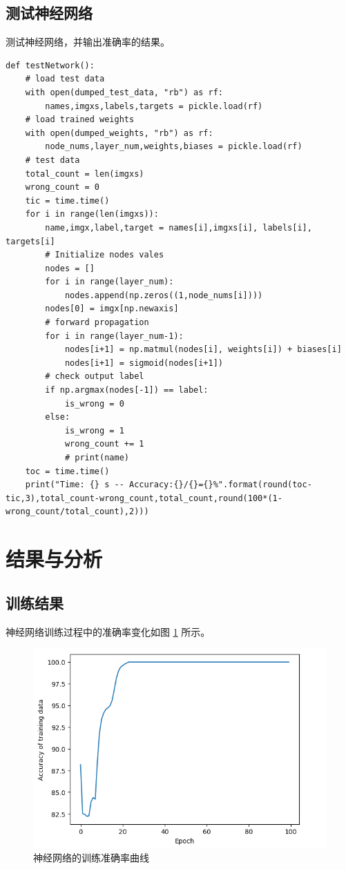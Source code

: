 \documentclass[a4paper, 12pt]{article}
\begin{document}
\subsection{测试神经网络}
测试神经网络，并输出准确率的结果。

\begin{lstlisting}[style=myPython,caption={测试神经网络}]
def testNetwork():
    # load test data
    with open(dumped_test_data, "rb") as rf:
        names,imgxs,labels,targets = pickle.load(rf)
    # load trained weights
    with open(dumped_weights, "rb") as rf:
        node_nums,layer_num,weights,biases = pickle.load(rf)
    # test data
    total_count = len(imgxs)
    wrong_count = 0
    tic = time.time()
    for i in range(len(imgxs)):
        name,imgx,label,target = names[i],imgxs[i], labels[i], targets[i]
        # Initialize nodes vales
        nodes = []
        for i in range(layer_num):
            nodes.append(np.zeros((1,node_nums[i])))
        nodes[0] = imgx[np.newaxis]
        # forward propagation
        for i in range(layer_num-1):
            nodes[i+1] = np.matmul(nodes[i], weights[i]) + biases[i]
            nodes[i+1] = sigmoid(nodes[i+1])
        # check output label
        if np.argmax(nodes[-1]) == label:
            is_wrong = 0
        else:
            is_wrong = 1
            wrong_count += 1
            # print(name)
    toc = time.time()
    print("Time: {} s -- Accuracy:{}/{}={}%".format(round(toc-tic,3),total_count-wrong_count,total_count,round(100*(1-wrong_count/total_count),2)))
\end{lstlisting}

\newpage

\section{结果与分析}
\subsection{训练结果}

神经网络训练过程中的准确率变化如图 \ref{fig:train} 所示。

\begin{figure}[htbp]
\centering
\includegraphics[width=\textwidth]{images/train.png}
\caption{神经网络的训练准确率曲线}
\label{fig:train}
\end{figure}
\end{document}
